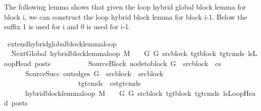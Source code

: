 \begin{isabellebody}
%
\endisatagdocument
{\isafolddocument}%
%
\isadelimdocument
%
\endisadelimdocument
%
\begin{isamarkuptext}%
The following lemma shows that given the loop hybrid global block lemma for block i, we can construct
the loop hybrid block lemma for block i-1. Below the suffix 1 is used for i and 0 is used for i-1.%
\end{isamarkuptext}\isamarkuptrue%
\isamarkupfalse%
\ extend{\isacharunderscore}{\kern0pt}hybrid{\isacharunderscore}{\kern0pt}global{\isacharunderscore}{\kern0pt}block{\isacharunderscore}{\kern0pt}lemma{\isacharunderscore}{\kern0pt}loop{\isacharcolon}{\kern0pt}\isanewline
\ \ NextGlobal{\isacharcolon}{\kern0pt}\ {\isachardoublequoteopen}hybrid{\isacharunderscore}{\kern0pt}block{\isacharunderscore}{\kern0pt}lemma{\isacharunderscore}{\kern0pt}loop\ M\ {\isasymLambda}\ {\isasymGamma}\ {\isasymOmega}\ G\ G{\isacharprime}{\kern0pt}\ src{\isacharunderscore}{\kern0pt}block{\isacharunderscore}{\kern0pt}{}\ tgt{\isacharunderscore}{\kern0pt}block\ tgt{\isacharunderscore}{\kern0pt}cmds{\isacharunderscore}{\kern0pt}{}\ lsLoopHead\ posts{\isachardoublequoteclose}\ \ \ \ \isanewline
\ \ \ \ \ \ SourceBlock{\isacharcolon}{\kern0pt}\ {\isachardoublequoteopen}node{\isacharunderscore}{\kern0pt}to{\isacharunderscore}{\kern0pt}block\ G\ {\isacharbang}{\kern0pt}\ src{\isacharunderscore}{\kern0pt}block{\isacharunderscore}{\kern0pt}{}\ {\isacharequal}{\kern0pt}\ cs{\isachardoublequoteclose}\isanewline
\ \ \ \ \ \ SourceSucc{\isacharcolon}{\kern0pt}\ {\isachardoublequoteopen}out{\isacharunderscore}{\kern0pt}edges\ G\ {\isacharbang}{\kern0pt}\ src{\isacharunderscore}{\kern0pt}block{\isacharunderscore}{\kern0pt}{}\ {\isacharequal}{\kern0pt}\ {\isacharbrackleft}{\kern0pt}src{\isacharunderscore}{\kern0pt}block{\isacharunderscore}{\kern0pt}{}{\isacharbrackright}{\kern0pt}{\isachardoublequoteclose}\isanewline
\ \ \ \ \ \ \ \ \ \ \ \ \ \ \ \ \ \ \ \ \ {\isachardoublequoteopen}tgt{\isacharunderscore}{\kern0pt}cmds{\isacharunderscore}{\kern0pt}{}\ {\isacharequal}{\kern0pt}\ cs{\isacharat}{\kern0pt}tgt{\isacharunderscore}{\kern0pt}cmds{\isacharunderscore}{\kern0pt}{}{\isachardoublequoteclose}\isanewline
\ \ \ \ \ \ \ \ \ \ \ \ \ \ \ \ \ \ \ \ \ \isanewline
\ \ \ \ \ \ {\isachardoublequoteopen}hybrid{\isacharunderscore}{\kern0pt}block{\isacharunderscore}{\kern0pt}lemma{\isacharunderscore}{\kern0pt}loop\ M\ {\isasymLambda}\ {\isasymGamma}\ {\isasymOmega}\ G\ G{\isacharprime}{\kern0pt}\ src{\isacharunderscore}{\kern0pt}block{\isacharunderscore}{\kern0pt}{}\ tgt{\isacharunderscore}{\kern0pt}block\ tgt{\isacharunderscore}{\kern0pt}cmds{\isacharunderscore}{\kern0pt}{}\ lsLoopHead\ posts{\isachardoublequoteclose}\isanewline

\end{isabellebody}
